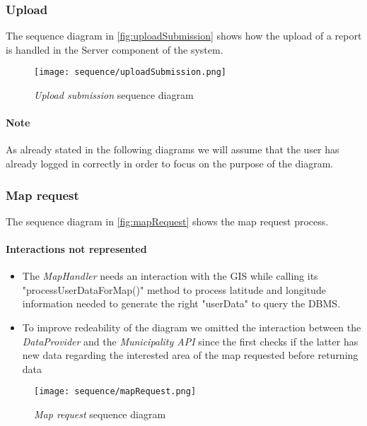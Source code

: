 \subsubsection{Upload}

	\label{sec:uploadRunView}
	The sequence diagram in \autoref{fig:uploadSubmission} shows how the upload of a report is handled in the Server component of the system.

	\begin{figure}[h!]
		\centering
		\texttt{[image: sequence/uploadSubmission.png]}
		\caption{
			\label{fig:uploadSubmission} 
			\emph{Upload submission} sequence diagram
		}
	\end{figure}
	\clearpage

\paragraph{Note} As already stated in the following diagrams we will assume that the user has already logged in correctly
	in order to focus on the purpose of the diagram.\\

\subsubsection{Map request}
The sequence diagram in \autoref{fig:mapRequest} shows the map request process.\\

\paragraph{Interactions not represented}
\begin{itemize}
\item The \emph{MapHandler} needs an interaction with the GIS while calling its "processUserDataForMap()" method	
	to process latitude and longitude information needed to generate the right "userData" to query the DBMS. 
\item To improve redeability of the diagram we omitted the interaction between the \emph{DataProvider} and the 
	\emph{Municipality API} since the first checks if the latter has new data regarding the interested area of the 
	map requested before returning data
\end{itemize}

\begin{figure}[h!]  
	\centering
	\texttt{[image: sequence/mapRequest.png]}
	\caption{
		\label{fig:mapRequest} 
		\emph{Map request} sequence diagram
	}
\end{figure}

